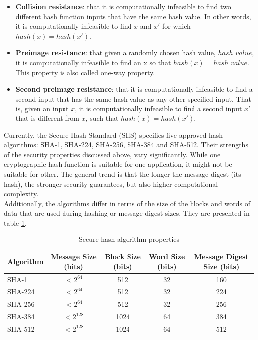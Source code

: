\begin{itemize}
	\item \textbf{Collision resistance}: that it is computationally infeasible
	to find two different hash function inputs that have the same hash value.
	In other words, it is computationally infeasible to find $x$ and $x'$ for
	which $hash(x) = hash(x')$.
	\item \textbf{Preimage resistance}: that given a randomly chosen hash
	value, $hash\_value$, it is computationally infeasible to find an x so that
	$hash(x) = hash\_value$. This property is also called one-way property.
	\item \textbf{Second preimage resistance}: that it is computationally
	infeasible to find a second input that has the same hash value as any other
	specified input. That is, given an input $x$, it is computationally
	infeasible to find a second input $x'$ that is different from $x$, such
	that $hash(x) = hash(x')$.
\end{itemize}

Currently, the Secure Hash Standard (SHS) \cite{fips-shs} specifies five
approved hash algorithms: SHA-1, SHA-224, SHA-256, SHA-384 and SHA-512. Their
strengths of the security properties discussed above, vary significantly. While
one cryptographic hash function is suitable for one application, it might not
be suitable for other. The general trend is that the longer the message digest
(its hash), the stronger security guarantees, but also higher computational
complexity.\\

Additionally, the algorithms differ in terms of the size of the blocks and
words of data that are used during hashing or message digest sizes. They are
presented in table \ref{tab:hash-comparison}.

\begin{table}[h!]
\centering
\begin{tabular}{|l||c|c|c|c|}
	\hline
	Algorithm & Message Size (bits) & Block Size (bits) & Word Size (bits) & Message Digest Size (bits) \\ \hline \hline
	SHA-1   &  $< 2^{64}$ &  512 & 32 & 160 \\ \hline
	SHA-224 &  $< 2^{64}$ &  512 & 32 & 224 \\ \hline
	SHA-256 &  $< 2^{64}$ &  512 & 32 & 256 \\ \hline
	SHA-384 & $< 2^{128}$ & 1024 & 64 & 384 \\ \hline
	SHA-512 & $< 2^{128}$ & 1024 & 64 & 512 \\ \hline
\end{tabular}
\caption{Secure hash algorithm properties \cite{fips-shs}}
\label{tab:hash-comparison}
\end{table}

